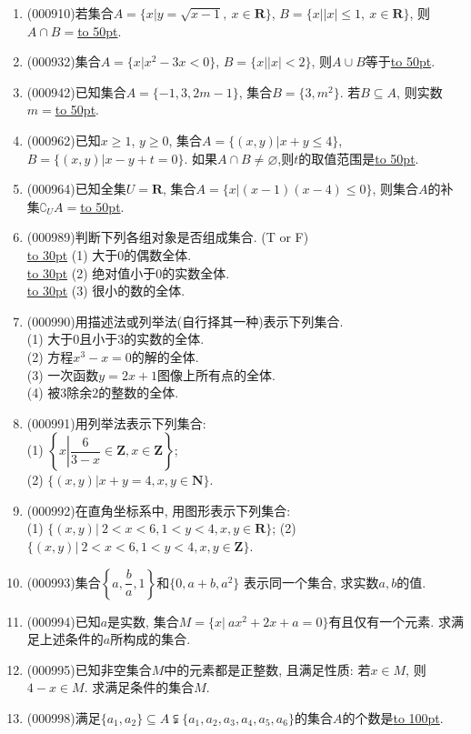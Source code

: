 \documentclass[10pt,a4paper]{article}
\newcommand{\blank}[1]{\underline{\hbox to #1pt{}}}
\begin{document}
\begin{enumerate}[1.]
\item {\tiny (000910)}若集合$A=\{x|y=\sqrt{x-1},\ x\in \mathbf{R}\}$, $B=\{x||x|\le 1,\ x\in \mathbf{R}\}$, 则$A\cap B=$\blank{50}.
\item {\tiny (000932)}集合$A=\{x|x^2-3x<0\}$, $B=\{x||x|<2\}$, 则$A\cup B$等于\blank{50}.
\item {\tiny (000942)}已知集合$A=\{-1,3,2m-1\}$, 集合$B=\{3,m^2\}$. 若$B\subseteq A$, 则实数$m=$\blank{50}.
\item {\tiny (000962)}已知$x\ge 1$, $y\ge 0$, 集合$A=\{(x,y)|x+y\le 4\}$, $B=\{(x,y)|x-y+t=0\}$. 如果$A\cap B\ne \varnothing$,则$t$的取值范围是\blank{50}.
\item {\tiny (000964)}已知全集$U=\mathbf{R}$, 集合$A=\{x|(x-1)(x-4)\le 0\}$, 则集合$A$的补集$\complement_UA=$\blank{50}.
\item {\tiny (000989)}判断下列各组对象是否组成集合. (T or F)\\ 
\blank{30} (1) 大于$0$的偶数全体.\\ 
\blank{30} (2) 绝对值小于$0$的实数全体.\\ 
\blank{30} (3) 很小的数的全体.
\item {\tiny (000990)}用描述法或列举法(自行择其一种)表示下列集合.\\ 
(1) 大于$0$且小于$3$的实数的全体.\\ 
(2) 方程$x^3-x=0$的解的全体.\\ 
(3) 一次函数$y=2x+1$图像上所有点的全体.\\ 
(4) 被$3$除余$2$的整数的全体.
\item {\tiny (000991)}用列举法表示下列集合:\\ 
(1) $\left\{x\left| \dfrac{6}{3-x}\in\mathbf{Z},x\in\mathbf{Z}\right.\right\}$;\\ 
(2) $\{(x,y)|x+y=4,x,y\in\mathbf{N}\}$.
\item {\tiny (000992)}在直角坐标系中, 用图形表示下列集合:\\ 
(1) $\{(x,y)|\ 2<x<6,1<y<4,x,y\in\mathbf{R}\}$; \hfill (2) $\{(x,y)|\ 2<x<6,1<y<4,x,y\in\mathbf{Z}\}$.
\item {\tiny (000993)}集合$\left\{a,\dfrac{b}{a},1\right\}$和$\{0,a+b,a^2\}$ 表示同一个集合, 求实数$a,b$的值.
\item {\tiny (000994)}已知$a$是实数, 集合$M=\{x|\ ax^2+2x+a=0\}$有且仅有一个元素. 求满足上述条件的$a$所构成的集合.
\item {\tiny (000995)}已知非空集合$M$中的元素都是正整数, 且满足性质: 若$x\in M$, 则$4-x\in M$. 求满足条件的集合$M$.
\item {\tiny (000998)}满足$\{a_1,a_2\}\subseteq A\subsetneqq\{a_1,a_2,a_3,a_4,a_5,a_6\}$的集合$A$的个数是\blank{100}.

\end{enumerate}
\end{document}
